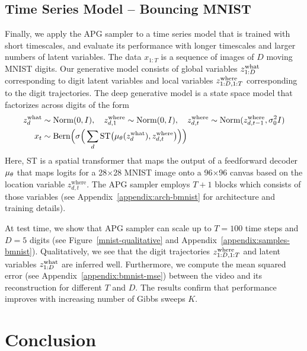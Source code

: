 \documentclass[anonymous=false, %
               format=acmsmall, %
               review=true, %
               screen=true, %
               nonacm=true]{acmart}
\theoremstyle{definition}
\begin{document}
\subsection{Time Series Model -- Bouncing MNIST}
Finally, we apply the APG sampler to a time series model that is trained with short timescales, and evaluate its performance with longer timescales and larger numbers of latent variables.
The data $x_{1:T}$ is a sequence of images of $D$ moving MNIST digits.
Our generative model consists of global variables $z_{1:D}^{\mathrm{what}}$ corresponding to digit latent variables and local variables $z_{1:D, 1:T}^{\mathrm{where}}$ corresponding to the digit trajectories.
The deep generative model is a state space model that factorizes across digits of the form
\begin{align*}
    z^{\mathrm{what}}_{d} 
    &\sim 
    \text{Norm}(0, I)
    ,
    \quad
    z^{\mathrm{where}}_{d, 1} \sim \text{Norm}(0, I)
    , 
    \quad
    z^{\mathrm{where}}_{d, t} 
    \sim 
    \text{Norm}(z^{\mathrm{where}}_{d, t - 1}, \sigma^2_0 I) 
    \\
    x_t 
    &\sim
    \mathrm{Bern}
    \Big(
        \sigma
        \Big(
            \sum_{d} \mathrm{ST}
            \big(
                \mu_\theta(z^{\mathrm{what}}_d), 
                z^{\mathrm{where}}_{d, t}
            \big)
        \Big)
    \Big)
\end{align*}
Here, ST is a spatial transformer \cite{jaderberg2015spatial} that maps the output of a feedforward decoder $\mu_\theta$ that maps logits for a 28$\times$28 MNIST image onto a 96$\times$96 canvas based on the location variable $z^{\mathrm{where}}_{d, t}$. The APG sampler employs $T+1$ blocks which consists of those variables (see Appendix~\ref{appendix:arch-bmnist} for architecture and training details).

At test time, we show that APG sampler can scale up to $T=100$ time steps and $D=5$ digits (see Figure~\ref{mnist-qualitative} and Appendix~\ref{appendix:samples-bmnist}). Qualitatively, we see that the digit trajectories $z_{1:D, 1:T}^{\mathrm{where}}$ and latent variables $z_{1:D}^{\mathrm{what}}$ are inferred well.
Furthermore, we compute the mean squared error (see Appendix~\ref{appendix:bmnist-mse}) between the video and its reconstruction for different $T$ and $D$. The results confirm that performance improves with increasing number of Gibbs sweeps $K$.
\section{Conclusion}
\end{document}
